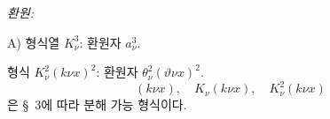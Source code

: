 
\noindent\emph{환원:}

\noindent A) 형식열 $K_\nu^3$: 환원자 $a_\nu^3$.

형식 $K_\nu^2(k\nu x)^2$: 환원자 $\theta_\nu^2(\vartheta\nu x)^2$.
\[
(k\nu x),\quad K_\nu(k\nu x),\quad K_\nu^2(k\nu x)
\]
은 \S\ 3에 따라 분해 가능 형식이다.

